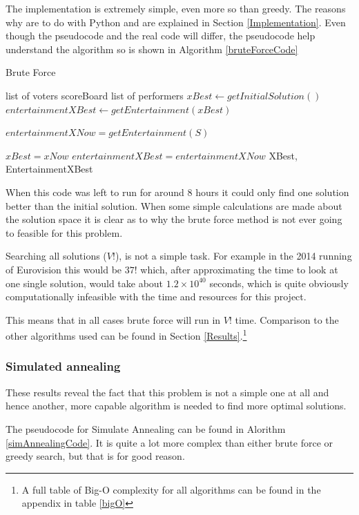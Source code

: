 \documentclass[12pt]{report}
\begin{document}
The implementation is extremely simple, even more so than greedy. The reasons why are to do with Python and are explained in Section \ref{Implementation}. Even though the pseudocode and the real code will differ, the pseudocode help understand the algorithm so is shown in Algorithm \ref{bruteForceCode}

\begin{algorithm}
\caption{Brute Force}
\label{bruteForceCode}
\begin{algorithmic}[1]
\REQUIRE list of voters
\REQUIRE scoreBoard
\REQUIRE list of performers
\STATE $xBest \leftarrow getInitialSolution()$
\STATE $entertainmentXBest \leftarrow getEntertainment(xBest)$

\STATE $entertainmentXNow = getEntertainment(S)$

\STATE $xBest = xNow$
\STATE $entertainmentXBest = entertainmentXNow$
\ENDIF
\ENDFOR
\RETURN XBest, EntertainmentXBest
\end{algorithmic}
\end{algorithm}

When this code was left to run for around 8 hours it could only find one solution better than the initial solution. When some simple calculations are made about the solution space it is clear as to why the brute force method is not ever going to feasible for this problem. 

Searching all solutions ($V!$), is not a simple task. For example in the 2014 running of Eurovision this would be $37!$ which, after approximating the time to look at one single solution, would take about $1.2\times10^{40}$ seconds, which is quite obviously computationally infeasible with the time and resources for this project.

This means that in all cases brute force will run in $V!$ time. Comparison to the other algorithms used can be found in Section \ref{Results}.\footnote{A full table of Big-O complexity for all algorithms can be found in the appendix in table \ref{bigO}}

\subsubsection{Simulated annealing}
These results reveal the fact that this problem is not a simple one at all and hence another, more capable algorithm is needed to find more optimal solutions. 

The pseudocode for Simulate Annealing can be found in Alorithm \ref{simAnnealingCode}. It is quite a lot more complex than either brute force or greedy search, but that is for good reason.
\end{document}
